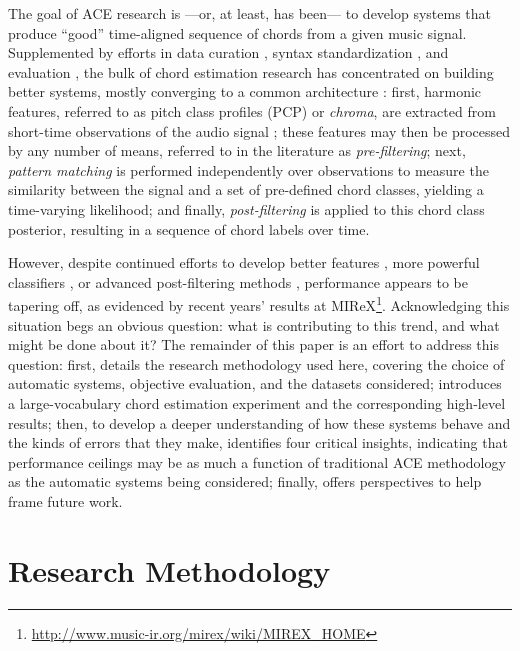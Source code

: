 \documentclass{article}
\begin{document}
The goal of ACE research is ---or, at least, has been--- to develop systems that produce ``good'' time-aligned sequence of chords from a given music signal.
Supplemented by efforts in data curation \cite{Burgoyne2011Expert}, syntax standardization \cite{Harte2005Symbolic}, and evaluation \cite{Pauwels2013Evaluating}, the bulk of chord estimation research has concentrated on building better systems, mostly converging to a common architecture \cite{Cho2014Improved}:
first, harmonic features, referred to as pitch class profiles (PCP) or \emph{chroma}, are extracted from short-time observations of the audio signal \cite{Fujishima1999Realtime};
these features may then be processed by any number of means, referred to in the literature as \emph{pre-filtering};
next, \emph{pattern matching} is performed independently over observations to measure the similarity between the signal and a set of pre-defined chord classes, yielding a time-varying likelihood;
and finally, \emph{post-filtering} is applied to this chord class posterior, resulting in a sequence of chord labels over time.

However, despite continued efforts to develop better features \cite{Mueller2010Towards}, more powerful classifiers \cite{Humphrey2012Rethinking}, or advanced post-filtering methods \cite{Boulanger2013Audio}, performance appears to be tapering off, as evidenced by recent years' results at MIReX\footnote{\url{http://www.music-ir.org/mirex/wiki/MIREX\_HOME}}.
Acknowledging this situation %
begs an obvious question:
what is contributing to this trend, and what might be done about it?
The remainder of this paper is an effort to address this question:
first,  details the research methodology used here, covering the choice of automatic systems, objective evaluation, and the datasets considered;
 introduces a large-vocabulary chord estimation experiment and the corresponding high-level results;
then, to develop a deeper understanding of how these systems behave and the kinds of errors that they make,  identifies four critical insights, indicating that performance ceilings may be as much a function of traditional ACE methodology as the automatic systems being considered;
finally,  offers perspectives to help frame future work.


\section{Research Methodology}
\label{sec:method}
\end{document}
